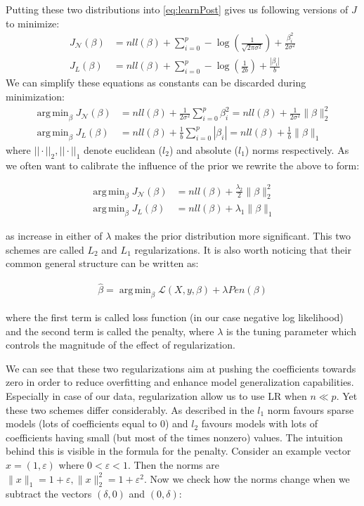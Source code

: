 \documentclass[shortabstract, english, mgr]{iithesis}
\DeclareMathOperator*{\argmin}{arg\,min}
\begin{document}
Putting these two distributions into \ref{eq:learnPost} gives us following versions of $J$ to minimize:
\begin{align*}
    J_{\mathcal{N}}(\beta) &= nll(\beta) + \sum_{i=0}^p -\log \left(\frac{1}{\sqrt{2 \pi \sigma^{2}}} \right) + \frac{\beta_i^{2}}{2 \sigma^{2}} \\
    J_{L}(\beta) &= nll(\beta) + \sum_{i=0}^p -\log \left(\frac{1}{2 b} \right) + \frac{|\beta_i|}{b}
\end{align*}
We can simplify these equations as constants can be discarded during minimization:
\begin{align*}
    \argmin_{\beta} J_{\mathcal{N}}(\beta) &= nll(\beta) + \frac{1}{2 \sigma^2}\sum_{i=0}^p \beta_i^{2} = nll(\beta) + \frac{1}{2 \sigma^2}\| \beta \|_2^2\\ 
    \argmin_{\beta} J_{L}(\beta) &= nll(\beta) + \frac{1}{b}\sum_{i=0}^p |\beta_i| = nll(\beta) + \frac{1}{b}\| \beta\|_1 
\end{align*}
where $||\cdot||_2, ||\cdot||_1$ denote euclidean ($l_2$) and absolute ($l_1$) norms respectively. As we often want to calibrate the influence of the prior we rewrite the above to form: 

\begin{align*}
    \argmin_{\beta} J_{\mathcal{N}}(\beta) &=  nll(\beta) + \frac{\lambda_2}{2}\| \beta \|_2^2\\ 
    \argmin_{\beta} J_{L}(\beta) &= nll(\beta) + \lambda_1\| \beta\|_1 
\end{align*}

as increase in either of $\lambda$ makes the prior distribution more significant. This two schemes are called $L_2$ and $L_1$ regularizations. It is also worth noticing that their common general structure can be written as:

\begin{align}
    \hat{\beta} = \argmin_{\beta} \mathcal{L}(X,y, \beta) + \lambda Pen(\beta) \label{eq:loss+pen}
\end{align}

where the first term is called loss function (in our case negative log likelihood) and the second term is called the penalty, where $\lambda$ is the tuning parameter which controls the magnitude of the effect of regularization.

We can see that these two regularizations aim at pushing the coefficients towards zero in order to reduce overfitting and enhance model generalization capabilities. Especially in case of our data, regularization allow us to use LR when $n \ll p$. Yet these two schemes differ considerably. As described in \cite[chapter 13.3.1]{MLprob} the $l_1$ norm favours sparse models (lots of coefficients equal to $0$) and $l_2$ favours models with lots of coefficients having small (but most of the times nonzero) values. The intuition behind this is visible in the formula for the penalty. Consider an example vector $x = (1, \varepsilon)$ where $0 < \varepsilon < 1$. Then the norms are $\|x\|_{1}=1+\varepsilon,  \|x\|_{2}^{2}=1+\varepsilon^{2}$. Now we check how the norms change when we subtract the vectors $(\delta, 0)$ and $(0, \delta)$:
\end{document}
